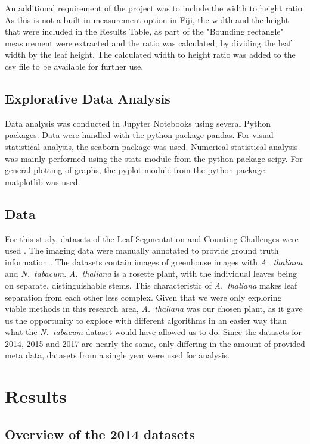 \documentclass[paper=A4,bibliography=totocnumbered]{scrartcl}
\begin{document}
An additional requirement of the project was to include the width to height ratio. As this is not a built-in measurement option in Fiji, the width and the height that were included in the Results Table, as part of the "Bounding rectangle" measurement were extracted and the ratio was calculated, by dividing the leaf width by the leaf height. The calculated width to height ratio was added to the csv file to be available for further use. 

\subsection{Explorative Data Analysis}
Data analysis was conducted in Jupyter Notebooks using several Python packages. Data were handled with the python package pandas. For visual statistical analysis, the seaborn package was used. Numerical statistical analysis was mainly performed using the stats module from the python package scipy. For general plotting of graphs, the pyplot module from the python package matplotlib was used.

\subsection{Data}
For this study, datasets of the Leaf Segmentation and Counting Challenges were used \citep{Minervini.2016}. The imaging data were manually annotated to provide ground truth information \citep{Scharr.2014}. The datasets contain images of greenhouse images with \textit{A.~thaliana} and \textit{N.~tabacum}. \textit{A.~thaliana} is a rosette plant, with the individual leaves being on separate, distinguishable stems. This characteristic of \textit{A.~thaliana} makes leaf separation from each other less complex.  Given that we were only exploring viable methods in this research area, \textit{A.~thaliana} was our chosen plant, as it gave us the opportunity to explore with different algorithms in an easier way than what the \textit{N.~tabacum} dataset would have allowed us to do. Since the datasets for 2014, 2015 and 2017 are nearly the same, only differing in the amount of provided meta data, datasets from a single year were used for analysis. 

\section{Results}
\subsection{Overview of the 2014 datasets}
\end{document}
